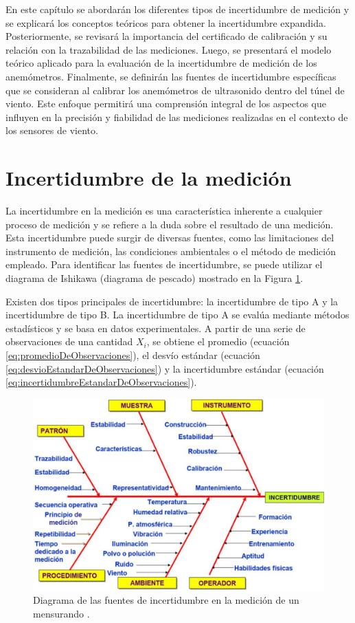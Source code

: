 En este capítulo se abordarán los diferentes tipos de incertidumbre de medición y se explicará los conceptos teóricos para obtener la incertidumbre expandida. Posteriormente, se revisará la importancia del certificado de calibración y su relación con la trazabilidad de las mediciones. Luego, se presentará el modelo teórico aplicado para la evaluación de la incertidumbre de medición de los anemómetros. Finalmente, se definirán las fuentes de incertidumbre específicas que se consideran al calibrar los anemómetros de ultrasonido dentro del túnel de viento.  Este enfoque permitirá una comprensión integral de los aspectos que influyen en la precisión y fiabilidad de las mediciones realizadas en el contexto de los sensores de viento.

\section{Incertidumbre de la medición}\label{sec:tipos_incertidumbre}

La incertidumbre en la medición es una característica inherente a cualquier proceso de medición y se refiere a la duda sobre el resultado de una medición. Esta incertidumbre puede surgir de diversas fuentes, como las limitaciones del instrumento de medición, las condiciones ambientales o el método de medición empleado. Para identificar las fuentes de incertidumbre, se puede utilizar el diagrama de Ishikawa (diagrama de pescado) mostrado en la Figura \ref{fig:diagramaPescado}.

Existen dos tipos principales de incertidumbre: la incertidumbre de tipo A y la incertidumbre de tipo B. La incertidumbre de tipo A se evalúa mediante métodos estadísticos y se basa en datos experimentales. A partir de una serie de observaciones de una cantidad $X_{i}$, se obtiene el promedio (ecuación \ref{eq:promedioDeObservaciones}), el desvío estándar (ecuación \ref{eq:desvioEstandarDeObservaciones}) y la incertidumbre estándar (ecuación \ref{eq:incertidumbreEstandarDeObservaciones}).


\begin{figure}[H]
    \centering
    \includegraphics[width=0.8\linewidth]{Figuras/calculoIncertidumbre/diagramaPescado.png}
    \caption{Diagrama de las fuentes de incertidumbre en la medición de un mensurando \cite{instrumentosMedicionesFiuba}.}
    \label{fig:diagramaPescado}
\end{figure}


